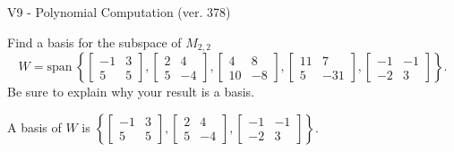 \begin{exercise}
  \begin{exerciseTitle}V9 - Polynomial Computation (ver. 378)\end{exerciseTitle}
  \begin{exerciseStatement}
    Find a basis for the subspace of \(M_{2,2}\) 
\[W=\mathrm{span}\ \left\{\left[\begin{array}{cc}
-1 & 3 \\
5 & 5
\end{array}\right] , \left[\begin{array}{cc}
2 & 4 \\
5 & -4
\end{array}\right] , \left[\begin{array}{cc}
4 & 8 \\
10 & -8
\end{array}\right] , \left[\begin{array}{cc}
11 & 7 \\
5 & -31
\end{array}\right] , \left[\begin{array}{cc}
-1 & -1 \\
-2 & 3
\end{array}\right]\right\}.\]
 Be sure to explain why your result is a basis.


  \end{exerciseStatement}
  \begin{exerciseAnswer}
   A basis of \(W\) is  \(\left\{\left[\begin{array}{cc}
-1 & 3 \\
5 & 5
\end{array}\right] , \left[\begin{array}{cc}
2 & 4 \\
5 & -4
\end{array}\right] , \left[\begin{array}{cc}
-1 & -1 \\
-2 & 3
\end{array}\right]\right\}\).
  


  \end{exerciseAnswer}
\end{exercise}